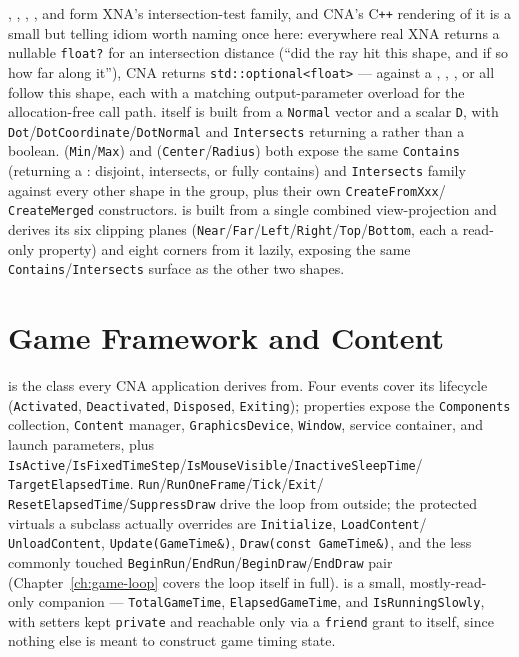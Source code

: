 , , , , and
 form XNA's intersection-test family, and CNA's C\texttt{++} rendering
of it is a small but telling idiom worth naming once here: everywhere real XNA returns a
nullable \texttt{float?} for an intersection distance (``did the ray hit this shape, and if so
how far along it''), CNA returns \texttt{std::optional<float>} --- 
against a , , , or
 all follow this shape, each with a matching output-parameter overload
for the allocation-free call path.  itself is built from a \texttt{Normal} vector
and a scalar \texttt{D}, with \texttt{Dot}/\texttt{DotCoordinate}/\texttt{DotNormal} and
\texttt{Intersects} returning a  rather than a boolean.
 (\texttt{Min}/\texttt{Max}) and 
(\texttt{Center}/\texttt{Radius}) both expose the same \texttt{Contains} (returning a
: disjoint, intersects, or fully contains) and \texttt{Intersects}
family against every other shape in the group, plus their own \texttt{CreateFromXxx}/%
\texttt{CreateMerged} constructors.  is built from a single combined
view-projection  and derives its six clipping planes
(\texttt{Near}/\texttt{Far}/\texttt{Left}/\texttt{Right}/\texttt{Top}/\texttt{Bottom}, each a
read-only  property) and eight corners from it lazily, exposing the same
\texttt{Contains}/\texttt{Intersects} surface as the other two shapes.

\section{Game Framework and Content}
\label{sec:api-game-content}

 is the class every CNA application derives from. Four events cover its
lifecycle (\texttt{Activated}, \texttt{Deactivated}, \texttt{Disposed}, \texttt{Exiting});
properties expose the \texttt{Components} collection, \texttt{Content} manager,
\texttt{GraphicsDevice}, \texttt{Window}, service container, and launch parameters, plus
\texttt{IsActive}/\texttt{IsFixedTimeStep}/\texttt{IsMouseVisible}/\texttt{InactiveSleepTime}/%
\texttt{TargetElapsedTime}. \texttt{Run}/\texttt{RunOneFrame}/\texttt{Tick}/\texttt{Exit}/%
\texttt{ResetElapsedTime}/\texttt{SuppressDraw} drive the loop from outside; the protected
virtuals a subclass actually overrides are \texttt{Initialize}, \texttt{LoadContent}/%
\texttt{UnloadContent}, \texttt{Update(GameTime\&)}, \texttt{Draw(const GameTime\&)}, and the
less commonly touched \texttt{BeginRun}/\texttt{EndRun}/\texttt{BeginDraw}/\texttt{EndDraw} pair
(Chapter~\ref{ch:game-loop} covers the loop itself in full).  is a small,
mostly-read-only companion --- \texttt{TotalGameTime}, \texttt{ElapsedGameTime}, and
\texttt{IsRunningSlowly}, with setters kept \texttt{private} and reachable only via a
\texttt{friend} grant to  itself, since nothing else is meant to construct game
timing state.


